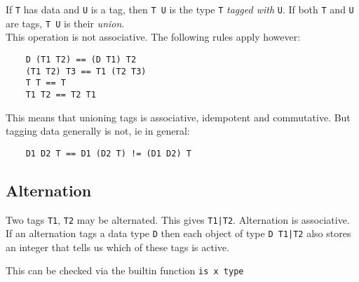 \documentclass{article}
\begin{document}
If \verb.T. has data and \verb.U. is a tag,
then \verb.T U. is the type \verb.T. \emph{tagged with}
\verb.U..
If both \verb.T. and \verb.U. are tags, \verb.T U.
is their \emph{union}.\\

This operation is not associative. The following rules
apply however:
\begin{verbatim}
    D (T1 T2) == (D T1) T2
    (T1 T2) T3 == T1 (T2 T3)
    T T == T 
    T1 T2 == T2 T1
\end{verbatim}
This means that unioning tags is associative, 
idempotent and commutative.
But tagging data generally is not,
ie in general:
\begin{verbatim}
    D1 D2 T == D1 (D2 T) != (D1 D2) T
\end{verbatim}

\subsection{Alternation}
Two tags \verb.T1., \verb.T2. may be alternated.
This gives \verb.T1|T2.. 
Alternation is associative. 
If an alternation
tags a data type \verb.D.
then each object of type \verb.D T1|T2.
also stores an integer that tells us which of 
these tags is active.

This can be checked via the builtin function
\verb.is x type.
\end{document}
